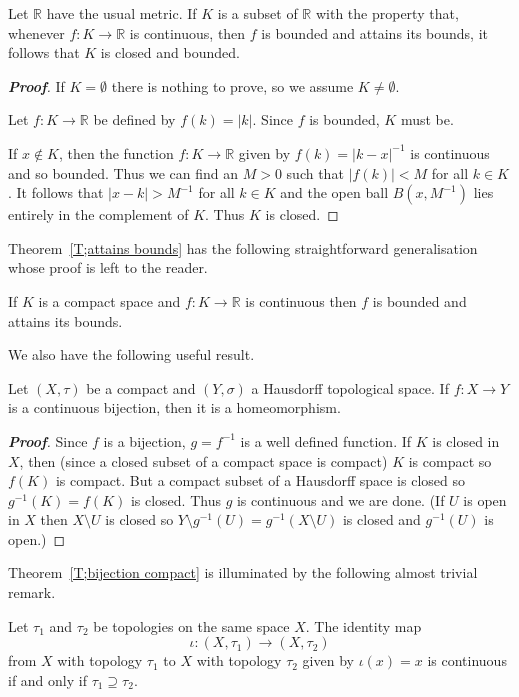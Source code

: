 \begin{theorem}\label{T;converse attains bounds}
Let ${\mathbb R}$ have the usual metric.
If $K$ is a subset of ${\mathbb R}$ with the property
that, whenever $f:K\rightarrow{\mathbb R}$ is continuous,
then $f$ is bounded and attains its bounds, it follows
that $K$ is closed and bounded.
\end{theorem}
\begin{proof}[\bf Proof] If $K=\emptyset$ there is nothing to prove,
so we assume $K\neq\emptyset$.

Let $f:K\rightarrow {\mathbb R}$ be defined by
$f(k)=|k|$. Since $f$ is bounded, $K$ must be.

If $x\notin K$, then the function $f:K\rightarrow {\mathbb R}$
given by $f(k)=|k-x|^{-1}$ is continuous and so bounded.
Thus we can find an $M>0$ such that $|f(k)|<M$ for all $k\in K$.
It follows that $|x-k|> M^{-1}$ for all $k\in K$
and the open ball $B(x,M^{-1})$ lies entirely in the complement
of $K$. Thus $K$ is closed.
\end{proof}



Theorem~\ref{T;attains bounds}
has the following straightforward generalisation
whose proof is left to the reader.
\begin{theorem}\label{T;compact attains bounds}
If $K$ is a compact space
and $f:K\rightarrow{\mathbb R}$ is continuous
then $f$ is bounded and attains its bounds.
\end{theorem}

We also have the following useful result.


\begin{theorem}\label{T;bijection compact}
Let $(X,\tau)$ be a compact and $(Y,\sigma)$
a Hausdorff topological space. If $f:X\rightarrow Y$
is a continuous bijection, then it is a homeomorphism.
\end{theorem}

\begin{proof}[\bf Proof] Since $f$ is a bijection, $g=f^{-1}$ is a well
defined function. If $K$ is closed in $X$, then (since a closed
subset of a compact space is compact) $K$ is compact
so $f(K)$ is compact. But a compact subset of a Hausdorff
space is closed so $g^{-1}(K)=f(K)$ is closed. Thus
$g$ is continuous and we are done. (If $U$ is open in $X$
then $X\setminus U$ is closed so $Y\setminus g^{-1}(U)=g^{-1}(X\setminus U)$
is closed and $g^{-1}(U)$ is open.)
\end{proof}

Theorem~\ref{T;bijection compact} is illuminated by the following
almost trivial remark.
\begin{lemma} Let $\tau_{1}$ and $\tau_{2}$ be topologies
on the same space $X$. The identity map
\[\iota:(X,\tau_{1})\rightarrow(X,\tau_{2})\]
from $X$ with topology $\tau_{1}$ to
$X$ with topology $\tau_{2}$ given by $\iota(x)=x$
is continuous if and only if $\tau_{1}\supseteq\tau_{2}$.
\end{lemma}

